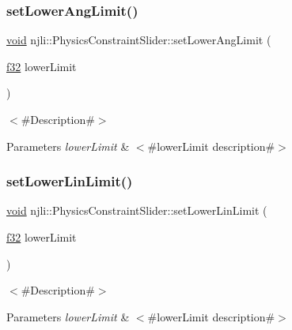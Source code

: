 \subsubsection{\texorpdfstring{set\+Lower\+Ang\+Limit()}{setLowerAngLimit()}}
{\footnotesize\ttfamily \mbox{\hyperlink{_thread_8h_af1e856da2e658414cb2456cb6f7ebc66}{void}} njli\+::\+Physics\+Constraint\+Slider\+::set\+Lower\+Ang\+Limit (\begin{DoxyParamCaption}\item[{\mbox{\hyperlink{_util_8h_a5f6906312a689f27d70e9d086649d3fd}{f32}}}]{lower\+Limit }\end{DoxyParamCaption})}

$<$\#\+Description\#$>$


\begin{DoxyParams}{Parameters}
{\em lower\+Limit} & $<$\#lower\+Limit description\#$>$ \\
\hline
\end{DoxyParams}
\mbox{\label{classnjli_1_1_physics_constraint_slider_a8ce84b863a5f45630d74285509a5f72e}} 
\subsubsection{\texorpdfstring{set\+Lower\+Lin\+Limit()}{setLowerLinLimit()}}
{\footnotesize\ttfamily \mbox{\hyperlink{_thread_8h_af1e856da2e658414cb2456cb6f7ebc66}{void}} njli\+::\+Physics\+Constraint\+Slider\+::set\+Lower\+Lin\+Limit (\begin{DoxyParamCaption}\item[{\mbox{\hyperlink{_util_8h_a5f6906312a689f27d70e9d086649d3fd}{f32}}}]{lower\+Limit }\end{DoxyParamCaption})}

$<$\#\+Description\#$>$


\begin{DoxyParams}{Parameters}
{\em lower\+Limit} & $<$\#lower\+Limit description\#$>$ \\
\hline
\end{DoxyParams}
\mbox{\label{classnjli_1_1_physics_constraint_slider_a3bc3e5a8ed7d5d139f826f80baf8a4e5}} 

